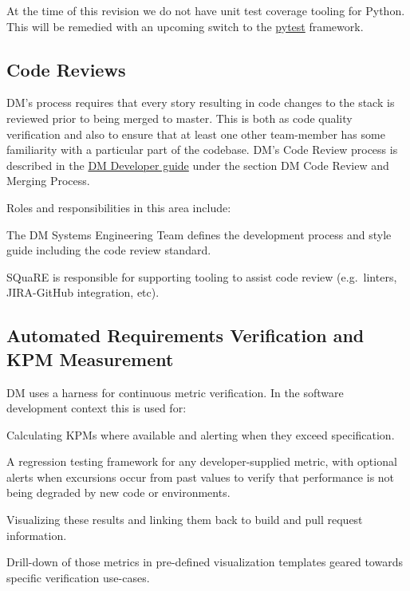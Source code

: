 At the time of this revision we do not have unit test coverage tooling for Python. This will be remedied with an upcoming switch to the \href{http://www.pytest.org}{pytest} framework.

\subsection{Code Reviews}

DM’s process requires that every story resulting in code changes to the stack is reviewed prior to being merged to master. This is both as code quality verification and also to ensure that at least one other team-member has some familiarity with a particular part of the codebase. DM’s Code Review process is described in the \href{https://developer.lsst.io}{DM Developer guide} under the section DM Code Review and Merging Process.

Roles and responsibilities in this area include:

\begin{itemize_single}

\item The DM Systems Engineering Team defines the development process and style guide including the code review standard.

\item SQuaRE is responsible for supporting tooling to assist code review (e.g.\ linters, JIRA-GitHub integration, etc).

\end{itemize_single}

\subsection{Automated Requirements Verification and KPM Measurement}

DM uses a harness for continuous metric verification. In the software development context this is used for:

\begin{itemize_single}

\item Calculating KPMs where available and alerting when they exceed specification.

\item A regression testing framework for any developer-supplied metric, with optional alerts when excursions occur from past values to verify that performance is not being degraded by new code or environments.

\item Visualizing these results and linking them back to build and pull request information.

\item  Drill-down of those metrics in pre-defined visualization templates geared towards specific verification use-cases.

\end{itemize_single}

